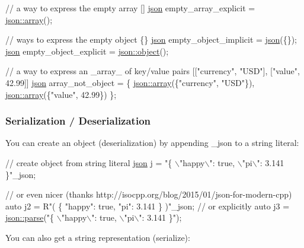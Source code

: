 \begin{DoxyCode}
\textcolor{comment}{// a way to express the empty array []}
\hyperlink{a00025}{json} empty\_array\_explicit = \hyperlink{a00025_a5685815624b086caa532f41e853d4b0f}{json::array}();

\textcolor{comment}{// ways to express the empty object \{\}}
\hyperlink{a00025}{json} empty\_object\_implicit = \hyperlink{a00025}{json}(\{\});
\hyperlink{a00025}{json} empty\_object\_explicit = \hyperlink{a00025_ad25b2f8c21e241e2d63455537a9294ff}{json::object}();

\textcolor{comment}{// a way to express an \_array\_ of key/value pairs [["currency", "USD"], ["value", 42.99]]}
\hyperlink{a00025}{json} array\_not\_object = \{ \hyperlink{a00025_a5685815624b086caa532f41e853d4b0f}{json::array}(\{\textcolor{stringliteral}{"currency"}, \textcolor{stringliteral}{"USD"}\}), 
      \hyperlink{a00025_a5685815624b086caa532f41e853d4b0f}{json::array}(\{\textcolor{stringliteral}{"value"}, 42.99\}) \};
\end{DoxyCode}


\subsubsection*{Serialization / Deserialization}

You can create an object (deserialization) by appending {\ttfamily \+\_\+json} to a string literal\+:


\begin{DoxyCode}
\textcolor{comment}{// create object from string literal}
\hyperlink{a00025}{json} j = \textcolor{stringliteral}{"\{ \(\backslash\)"happy\(\backslash\)": true, \(\backslash\)"pi\(\backslash\)": 3.141 \}"}\_json;

\textcolor{comment}{// or even nicer (thanks http://isocpp.org/blog/2015/01/json-for-modern-cpp)}
\textcolor{keyword}{auto} j2 = R\textcolor{stringliteral}{"(}
\textcolor{stringliteral}{  \{}
\textcolor{stringliteral}{    "happy": true,}
\textcolor{stringliteral}{    "pi": 3.141}
\textcolor{stringliteral}{  \}}
\textcolor{stringliteral}{)"\_json;}
\textcolor{stringliteral}{}
\textcolor{stringliteral}{}\textcolor{comment}{// or explicitly}
\textcolor{keyword}{auto} j3 = \hyperlink{a00025_a35303ad045a06c2a79dc28ac29652e86}{json::parse}(\textcolor{stringliteral}{"\{ \(\backslash\)"happy\(\backslash\)": true, \(\backslash\)"pi\(\backslash\)": 3.141 \}"});
\end{DoxyCode}


You can also get a string representation (serialize)\+:


